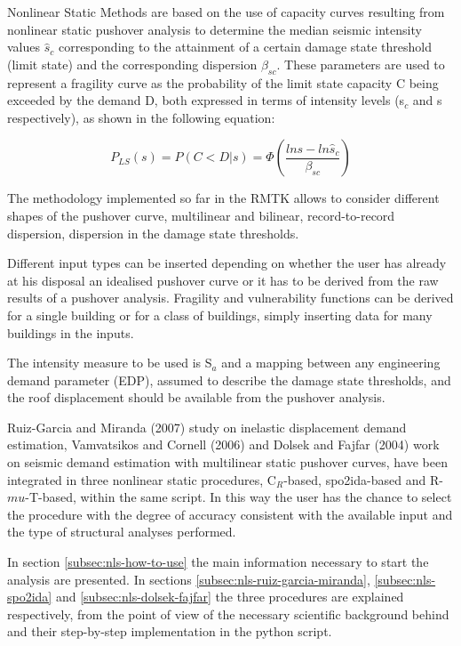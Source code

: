 Nonlinear Static Methods are based on the use of capacity curves resulting from nonlinear static pushover analysis to determine the median seismic intensity values $\hat{s}_c$ corresponding to the attainment of a certain damage state threshold (limit state) and the corresponding dispersion $\beta_{sc}$. These parameters are used to represent a fragility curve as the probability of the limit state capacity C being exceeded by the demand D, both expressed in terms of intensity levels (s$_c$ and s respectively), as shown in the following equation:

\begin{equation}
P_{LS}(s) = P(C < D | s) = \Phi(\frac{ln s -ln \hat{s}_c}{\beta_{sc}})
\label{eq:fragility-definition}
\end{equation}

The methodology implemented so far in the RMTK allows to consider different shapes of the pushover curve, multilinear and bilinear, record-to-record dispersion, dispersion in the damage state thresholds. 

Different input types can be inserted depending on whether the user has already at his disposal an idealised pushover curve or it has to be derived from the raw results of a pushover analysis. Fragility and vulnerability functions can be derived for a single building or for a class of buildings, simply inserting data for many buildings in the inputs.

The intensity measure to be used is S$_a$ and a mapping between any engineering demand parameter (EDP), assumed to describe the damage state thresholds, and the roof displacement should be available from the pushover analysis.

Ruiz-Garcia and Miranda (2007) study on inelastic displacement demand estimation, Vamvatsikos and Cornell (2006) and Dolsek and Fajfar (2004) work on seismic demand estimation with multilinear static pushover curves, have been integrated in three nonlinear static procedures, C$_R$-based, spo2ida-based and R-$mu$-T-based, within the same script. In this way the user has the chance to select the procedure with the degree of accuracy consistent with the available input and the type of structural analyses performed. 

In section \ref{subsec:nls-how-to-use} the main information necessary to start the analysis are presented. In sections \ref{subsec:nls-ruiz-garcia-miranda}, \ref{subsec:nls-spo2ida} and \ref{subsec:nls-dolsek-fajfar} the three procedures are explained respectively, from the point of view of the necessary scientific background behind and their step-by-step implementation in the python script.